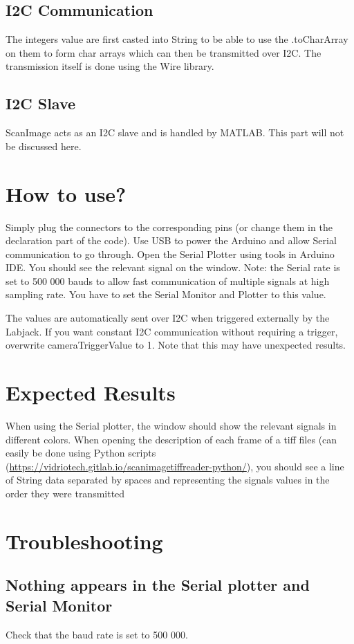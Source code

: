 \documentclass[a4paper]{article}
\begin{document}
\subsection{I2C Communication}
The integers value are first casted into String to be able to use the .toCharArray on them to form char arrays which can then be transmitted over I2C.
The transmission itself is done using the Wire library.

\subsection{I2C Slave}
ScanImage acts as an I2C slave and is handled by MATLAB. This part will not be discussed here.

\section{How to use?}
Simply plug the connectors to the corresponding pins (or change them in the declaration part of the code).
Use USB to power the Arduino and allow Serial communication to go through. Open the Serial Plotter using tools in Arduino IDE. You should see the relevant signal on the window.
Note: the Serial rate is set to 500 000 bauds to allow fast communication of multiple signals at high sampling rate. You have to set the Serial Monitor and Plotter to this value.

The values are automatically sent over I2C when triggered externally by the Labjack. If you want constant I2C communication without requiring a trigger, overwrite cameraTriggerValue to 1. Note that this may have unexpected results. 

\section{Expected Results}
When using the Serial plotter, the window should show the relevant signals in different colors.
When opening the description of each frame of a tiff files (can easily be done using Python scripts (\url{https://vidriotech.gitlab.io/scanimagetiffreader-python/}), you should see a line of String data separated by spaces and representing the signals values in the order they were transmitted

\section{Troubleshooting}
\subsection{Nothing appears in the Serial plotter and Serial Monitor}
Check that the baud rate is set to 500 000.
\end{document}
